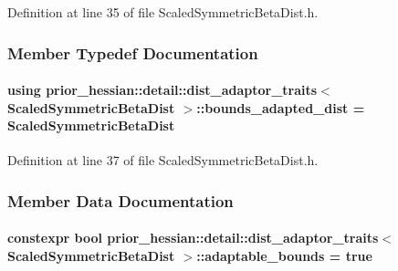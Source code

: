 Definition at line 35 of file Scaled\+Symmetric\+Beta\+Dist.\+h.



\subsubsection{Member Typedef Documentation}
\paragraph[{\texorpdfstring{bounds\+\_\+adapted\+\_\+dist}{bounds_adapted_dist}}]{\setlength{\rightskip}{0pt plus 5cm}using {\bf prior\+\_\+hessian\+::detail\+::dist\+\_\+adaptor\+\_\+traits}$<$ {\bf Scaled\+Symmetric\+Beta\+Dist} $>$\+::{\bf bounds\+\_\+adapted\+\_\+dist} =  {\bf Scaled\+Symmetric\+Beta\+Dist}}\hypertarget{structprior__hessian_1_1detail_1_1dist__adaptor__traits_3_01ScaledSymmetricBetaDist_01_4_af99b07bac83d88a439a1db6ff22e106a}{}\label{structprior__hessian_1_1detail_1_1dist__adaptor__traits_3_01ScaledSymmetricBetaDist_01_4_af99b07bac83d88a439a1db6ff22e106a}


Definition at line 37 of file Scaled\+Symmetric\+Beta\+Dist.\+h.



\subsubsection{Member Data Documentation}
\paragraph[{\texorpdfstring{adaptable\+\_\+bounds}{adaptable_bounds}}]{\setlength{\rightskip}{0pt plus 5cm}constexpr bool {\bf prior\+\_\+hessian\+::detail\+::dist\+\_\+adaptor\+\_\+traits}$<$ {\bf Scaled\+Symmetric\+Beta\+Dist} $>$\+::adaptable\+\_\+bounds = true\hspace{0.3cm}{\ttfamily [static]}}\hypertarget{structprior__hessian_1_1detail_1_1dist__adaptor__traits_3_01ScaledSymmetricBetaDist_01_4_a1397bad1101d8766df40fa603d22e4af}{}\label{structprior__hessian_1_1detail_1_1dist__adaptor__traits_3_01ScaledSymmetricBetaDist_01_4_a1397bad1101d8766df40fa603d22e4af}


